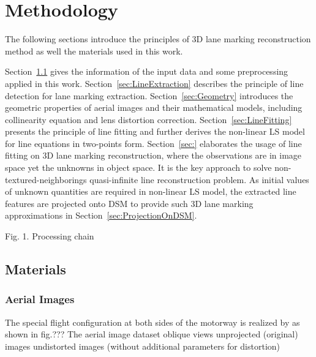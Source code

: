 
\chapter{Methodology}
\label{chap:k2}

The following sections introduce the principles of 3D lane marking reconstruction method as well the materials used in this work.

Section~\ref{sec:Materials} gives the information of the input data and some preprocessing applied in this work.
Section~\ref{sec:LineExtraction} describes the principle of line detection for lane marking extraction.
Section~\ref{sec:Geometry} introduces the geometric properties of aerial images and their mathematical models, including collinearity equation and lens distortion correction. 
Section~\ref{sec:LineFitting} presents the principle of line fitting and further derives the non-linear LS model for line equations in two-points form.
Section~\ref{sec:} elaborates the usage of line fitting on 3D lane marking reconstruction, where the observations are in image space yet the unknowns in object space. It is the key approach to solve non-textured-neighborings quasi-infinite line reconstruction problem.
As initial values of unknown quantities are required in non-linear LS model, the extracted line features are projected onto DSM to provide such 3D lane marking approximations in Section~\ref{sec:ProjectionOnDSM}.

Fig. 1. Processing chain



\section{Materials}
\label{sec:Materials}


\subsection{Aerial Images}

The special flight configuration at both sides of the motorway is realized by 
as shown in fig.???
The aerial image dataset oblique views
unprojected (original) images
undistorted images (without additional parameters for distortion)

